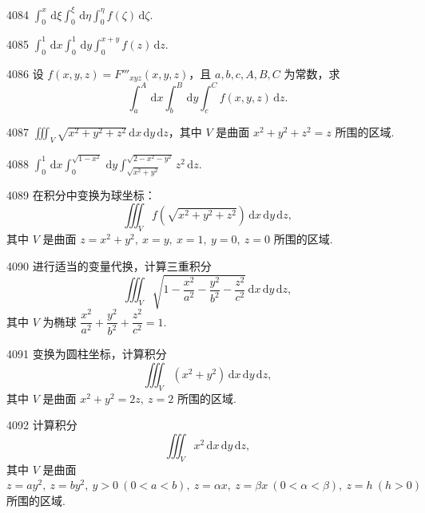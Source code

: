 
\begin{prob}[S]{4084}
$\displaystyle \int_{0}^{x} \,\mathrm{d}\xi \int_{0}^{\xi} \,\mathrm{d}\eta \int_{0}^{\eta} f(\zeta)\,\mathrm{d}\zeta$.
\end{prob}

\begin{prob}[S]{4085}
$\displaystyle \int_{0}^{1} \,\mathrm{d}x \int_{0}^{1} \,\mathrm{d}y \int_{0}^{x+y} f(z)\,\mathrm{d}z$.
\end{prob}

\begin{prob}[M]{4086}
设 $f(x, y, z) = F'''_{xyz}(x, y, z)$，且 $a, b, c, A, B, C$ 为常数，求
\[
\int_{a}^{A} \,\mathrm{d}x \int_{b}^{B} \,\mathrm{d}y \int_{c}^{C} f(x, y, z)\,\mathrm{d}z.
\]
\end{prob}


\begin{prob}[M]{4087}
$\displaystyle \iiint_{V} \sqrt{x^2+y^2+z^2} \,\mathrm{d}x\,\mathrm{d}y\,\mathrm{d}z$，其中 $V$ 是曲面 $x^2+y^2+z^2=z$ 所围的区域.
\end{prob}

\begin{prob}[M]{4088}
$\displaystyle \int_{0}^{1} \,\mathrm{d}x \int_{0}^{\sqrt{1-x^2}} \,\mathrm{d}y \int_{\sqrt{x^2+y^2}}^{\sqrt{2-x^2-y^2}} z^2 \,\mathrm{d}z$.
\end{prob}

\begin{prob}[M]{4089}
在积分中变换为球坐标：
\[
\iiint_{V} f\left(\sqrt{x^2+y^2+z^2}\right) \,\mathrm{d}x\,\mathrm{d}y\,\mathrm{d}z,
\]
其中 $V$ 是曲面 $z=x^2+y^2,\ x=y,\ x=1,\ y=0,\ z=0$ 所围的区域.
\end{prob}

\begin{prob}[M]{4090}
进行适当的变量代换，计算三重积分
\[
\iiint_{V} \sqrt{1 - \frac{x^2}{a^2} - \frac{y^2}{b^2} - \frac{z^2}{c^2}} \,\mathrm{d}x\,\mathrm{d}y\,\mathrm{d}z,
\]
其中 $V$ 为椭球 $\dfrac{x^2}{a^2}+\dfrac{y^2}{b^2}+\dfrac{z^2}{c^2}=1$.
\end{prob}

\begin{prob}[M]{4091}
变换为圆柱坐标，计算积分
\[
\iiint_{V} (x^2+y^2) \,\mathrm{d}x\,\mathrm{d}y\,\mathrm{d}z,
\]
其中 $V$ 是曲面 $x^2+y^2=2z,\ z=2$ 所围的区域.
\end{prob}

\begin{prob}[M]{4092}
计算积分
\[
\iiint_{V} x^2 \,\mathrm{d}x\,\mathrm{d}y\,\mathrm{d}z,
\]
其中 $V$ 是曲面 $z=ay^2,\ z=by^2,\ y>0\ (0<a<b),\ z=\alpha x,\ z=\beta x\ (0<\alpha<\beta),\ z=h\ (h>0)$ 所围的区域.
\end{prob}

